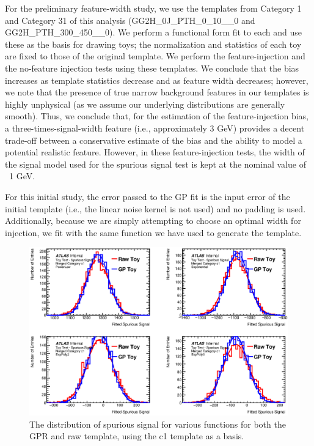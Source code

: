 For the preliminary feature-width study, we use the templates from Category 1 and Category 31 of this analysis (GG2H\_0J\_PTH\_0\_10\_\_0 and GG2H\_PTH\_300\_450\_\_0). We perform a functional form fit to each and use these as the basis for drawing toys; the normalization and statistics of each toy are fixed to those of the original template. We perform the feature-injection and the no-feature injection tests using these templates. We conclude that the bias increases as template statistics decrease and as feature width decreases; however, we note that the presence of true narrow background features in our templates is highly unphysical (as we assume our underlying distributions are generally smooth). Thus, we conclude that, for the estimation of the feature-injection bias, a three-times-signal-width feature (i.e., approximately 3 GeV) provides a decent trade-off between a conservative estimate of the bias and the ability to model a potential realistic feature. However, in these feature-injection tests, the width of the signal model used for the spurious signal test is kept at the nominal value of ~1 GeV.

For this initial study, the error passed to the GP fit is the input error of the initial template (i.e., the linear noise kernel is not used) and no padding is used. Additionally, because we are simply attempting to choose an optimal width for injection, we fit with the same function we have used to generate the template. 

\begin{figure} 
\begin{center}
  \includegraphics[width=\textwidth]{figures/background/gpr/validation/ToyTest_FitSigVals_Merged_Category_c1NoSig.eps}   
   \caption{The distribution of spurious signal for various functions for both the GPR and raw template, using the c1 template as a basis.}
\label{fig:c1NoSig}
\end{center}
\end{figure}

